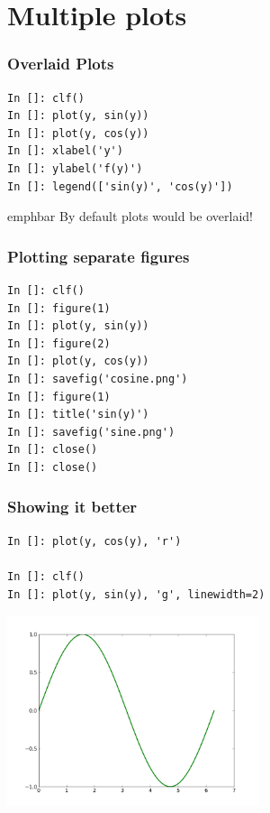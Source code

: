\documentclass[14pt,compress]{beamer}
\newcommand{\emphbar}[1]
{\begin{beamercolorbox}[rounded=true]{emphbar} 
      {#1}
 \end{beamercolorbox}
}
\newcounter{time}
\newcommand{\inctime}[1]{\addtocounter{time}{#1}{\tiny \thetime\ m}}
\begin{document}
\section{Multiple plots}
\begin{frame}[fragile]
\frametitle{Overlaid Plots}
\begin{lstlisting}
In []: clf()
In []: plot(y, sin(y))
In []: plot(y, cos(y))
In []: xlabel('y')
In []: ylabel('f(y)')
In []: legend(['sin(y)', 'cos(y)']) 
\end{lstlisting}
\emphbar{By default plots would be overlaid!}
\end{frame}

\begin{frame}[fragile]
\frametitle{Plotting separate figures}
\begin{lstlisting}
In []: clf()
In []: figure(1)
In []: plot(y, sin(y))
In []: figure(2)
In []: plot(y, cos(y))
In []: savefig('cosine.png')
In []: figure(1)
In []: title('sin(y)')
In []: savefig('sine.png')
In []: close()
In []: close()
\end{lstlisting}
\end{frame}

\begin{frame}[fragile]
\frametitle{Showing it better}
\vspace{-0.15in}
\begin{lstlisting}
In []: plot(y, cos(y), 'r')

In []: clf()
In []: plot(y, sin(y), 'g', linewidth=2)
\end{lstlisting}
\vspace*{-0.2in}
\begin{center}
  \includegraphics[height=2.2in, interpolate=true]{data/green}  
\end{center}
\end{frame}
\end{document}
